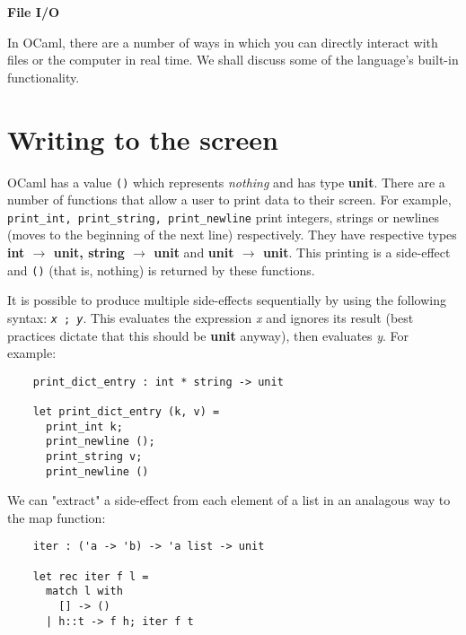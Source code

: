 \documentclass[12pt]{article}
\begin{document}
\begin{center}\LARGE\bf
    File I/O
\end{center}

In OCaml, there are a number of ways in which you can directly interact with files or the computer in real time.
We shall discuss some of the language's built-in functionality.

\section{Writing to the screen}
OCaml has a value \texttt{()} which represents \textit{nothing} and has type \textbf{unit}.
There are a number of functions that allow a user to print data to their screen. For example, \texttt{print\_int,
print\_string, print\_newline} print integers, strings or newlines (moves to the beginning of the next line) respectively. They have
respective types \textbf{int $\rightarrow$ unit, string $\rightarrow$ unit} and \textbf{unit $\rightarrow$ unit}. This printing is a side-effect and \texttt{()} (that is, nothing) is
returned by these functions.

It is possible to produce multiple side-effects sequentially by using the following syntax: \texttt{\textit{x} ; \textit{y}}. This evaluates the
expression \textit{x} and ignores its result (best practices dictate that this should be \textbf{unit} anyway), then evaluates \textit{y}. For
example:
\begin{lstlisting}
    print_dict_entry : int * string -> unit

    let print_dict_entry (k, v) =
      print_int k;
      print_newline ();
      print_string v;
      print_newline ()
\end{lstlisting}

We can "extract" a side-effect from each element of a list in an analagous way to the map function:
\begin{lstlisting}
    iter : ('a -> 'b) -> 'a list -> unit

    let rec iter f l =
      match l with
        [] -> ()
      | h::t -> f h; iter f t
\end{lstlisting}
\end{document}
